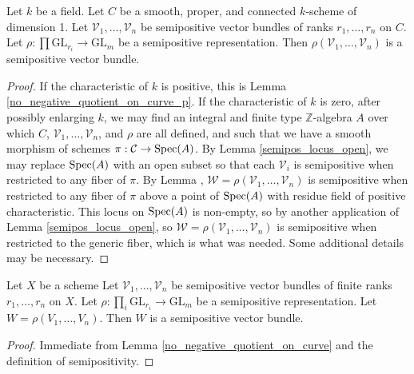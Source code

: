 \begin{lemma}\label{no_negative_quotient_on_curve}
Let $k$ be a field.
Let $C$ be a smooth, proper, and connected $k$-scheme of dimension 1.
Let $\mathcal{V}_1,\ldots,\mathcal{V}_n$ be semipositive vector bundles of
ranks $r_1,\ldots,r_n$ on $C$.
Let $\rho : \prod \mathrm{GL}_{r_i} \to \mathrm{GL}_m$ be a semipositive
representation.
Then $\rho(\mathcal{V}_1,\ldots,\mathcal{V}_n)$ is a semipositive vector bundle.
\end{lemma}
\begin{proof}
If the characteristic of $k$ is positive, this is Lemma
\ref{no_negative_quotient_on_curve_p}.
If the characteristic of $k$ is zero, after possibly enlarging $k$, we may find
an integral and finite type $\mathbb{Z}$-algebra $A$ over which $C$,
$\mathcal{V}_1,\ldots,\mathcal{V}_n$, and $\rho$ are all defined, and such that
we have a smooth morphism of schemes $\pi : \mathcal{C} \to \mathop{\rm Spec}(A)$.
By Lemma \ref{semipos_locus_open}, we may replace $\mathop{\rm Spec}(A)$ with an open
subset so that each $\mathcal{V}_i$ is semipositive when restricted to any
fiber of $\pi$.
By Lemma \label{no_negative_quotient_on_curve_p},
$\mathcal{W} = \rho(\mathcal{V}_1,\ldots,\mathcal{V}_n)$ is semipositive when
restricted to any fiber of $\pi$ above a point of $\mathop{\rm Spec}(A)$ with residue field
of positive characteristic.
This locus on $\mathop{\rm Spec}(A)$ is non-empty, so by another application of Lemma
\ref{semipos_locus_open}, so
$\mathcal{W} = \rho(\mathcal{V}_1,\ldots,\mathcal{V}_n)$ is semipositive when
restricted to the generic fiber, which is what was needed.
Some additional details may be necessary.
\end{proof}


\begin{lemma}\label{apply_rho_still_semipos}
Let $X$ be a scheme
Let $\mathcal{V}_1,\ldots,\mathcal{V}_n$ be semipositive vector bundles of
finite ranks $r_1,\ldots,r_n$ on $X$.
Let $\rho:\prod_i \mathrm{GL}_{r_i} \to \mathrm{GL}_m$ be a semipositive
representation.
Let $W = \rho(V_1,\ldots,V_n)$.
Then $W$ is a semipositive vector bundle.
\end{lemma}

\begin{proof}
Immediate from Lemma \ref{no_negative_quotient_on_curve} and the definition of
semipositivity.
\end{proof}


